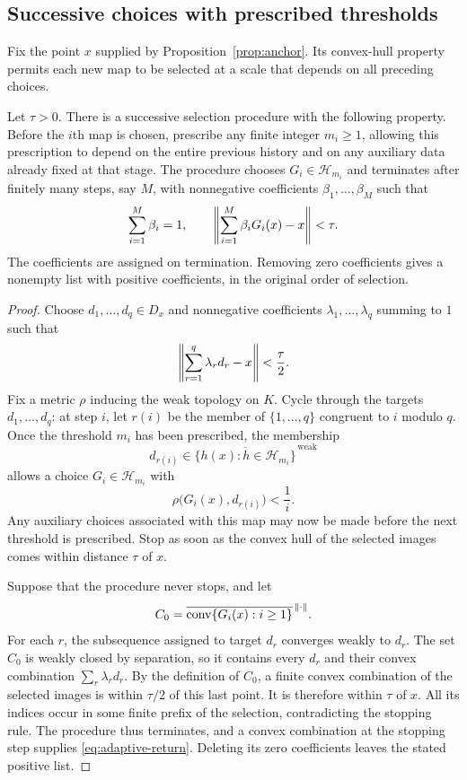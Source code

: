 \subsection{Successive choices with prescribed thresholds}

Fix the point $x$ supplied by Proposition~\ref{prop:anchor}.  Its
convex-hull property permits each new map to be selected at a scale
that depends on all preceding choices.

\begin{lemma}
\label{lem:adaptive-selection}
Let $\tau>0$.  There is a successive selection procedure with the
following property.  Before the $i$th map is chosen, prescribe any
finite integer $m_i\geq1$, allowing this prescription to depend on the
entire previous history and on any auxiliary data already fixed at
that stage.  The procedure chooses $G_i\in\mathcal H_{m_i}$ and
terminates after finitely many steps, say $M$, with nonnegative
coefficients $\beta_1,\ldots,\beta_M$ such that
\begin{equation}
\label{eq:adaptive-return}
 \sum_{i=1}^M\beta_i=1,
 \qquad
 \norm*{\sum_{i=1}^M\beta_iG_i(x)-x}<\tau.
\end{equation}
The coefficients are assigned on termination.  Removing zero
coefficients gives a nonempty list with positive coefficients,
in the original order of selection.
\end{lemma}

\begin{proof}
Choose $d_1,\ldots,d_q\in D_x$ and nonnegative coefficients
$\lambda_1,\ldots,\lambda_q$ summing to $1$ such that
\[
 \norm*{\sum_{r=1}^q\lambda_rd_r-x}<\frac\tau2.
\]
Fix a metric $\rho$ inducing the weak topology on $K$.  Cycle through
the targets $d_1,\ldots,d_q$: at step $i$, let $r(i)$ be the member of
$\{1,\ldots,q\}$ congruent to $i$ modulo $q$.  Once the threshold
$m_i$ has been prescribed, the membership
\[
 d_{r(i)}\in
 \overline{\{h(x):h\in\mathcal H_{m_i}\}}^{\,\mathrm{weak}}
\]
allows a choice $G_i\in\mathcal H_{m_i}$ with
\[
 \rho\bigl(G_i(x),d_{r(i)}\bigr)<\frac1i.
\]
Any auxiliary choices associated with this map may now be made before
the next threshold is prescribed.  Stop as soon as the convex hull
of the selected images comes within distance $\tau$ of $x$.

Suppose that the procedure never stops, and let
\[
 C_0=\overline{\conv\{G_i(x):i\geq1\}}^{\,\norm{\cdot}}.
\]
For each $r$, the subsequence assigned to target $d_r$ converges
weakly to $d_r$.  The set $C_0$ is weakly closed by separation, so
it contains every $d_r$ and their convex combination
$\sum_r\lambda_rd_r$.  By the definition of $C_0$, a finite convex
combination of the selected images is within $\tau/2$ of this last
point.  It is therefore within $\tau$ of $x$.  All its indices occur
in some finite prefix of the selection, contradicting the stopping
rule.  The procedure thus terminates, and a convex combination at
the stopping step supplies \eqref{eq:adaptive-return}.  Deleting its
zero coefficients leaves the stated positive list.
\end{proof}

